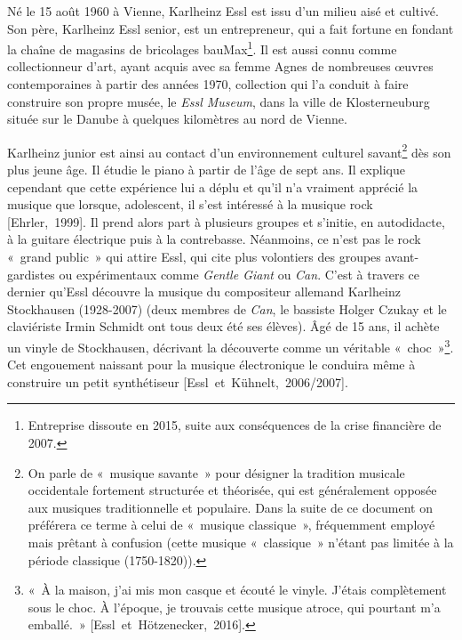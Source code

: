 \documentclass[a4paper,12pt]{article}
\newcommand{\guill}[1]{«~#1~»}
\newcommand{\cicite}[1]{{\footnotesize[#1]}}
\begin{document}
Né le 15 août 1960 à Vienne, Karlheinz Essl est issu d'un milieu aisé et cultivé. Son père, Karlheinz Essl senior, est un entrepreneur, qui a fait fortune en fondant la chaîne de magasins de bricolages bauMax\footnote{Entreprise dissoute en 2015, suite aux conséquences de la crise financière de 2007.}. Il est aussi connu comme collectionneur d'art, ayant acquis avec sa femme Agnes de nombreuses œuvres contemporaines à partir des années 1970, collection qui l'a conduit à faire construire son propre musée, le \emph{Essl Museum}, dans la ville de Klosterneuburg située sur le Danube à quelques kilomètres au nord de Vienne.

Karlheinz junior est ainsi au contact d'un environnement culturel savant\footnote{On parle de \guill{musique savante} pour désigner la tradition musicale occidentale fortement structurée et théorisée, qui est généralement opposée aux musiques traditionnelle et populaire. Dans la suite de ce document on préférera ce terme à celui de \guill{musique classique}, fréquemment employé mais prêtant à confusion (cette musique \guill{classique} n'étant pas limitée à la période classique (1750-1820)).} dès son plus jeune âge. Il étudie le piano à partir de l'âge de sept ans. Il explique cependant que cette expérience lui a déplu et qu'il n'a vraiment apprécié la musique que lorsque, adolescent, il s'est intéressé à la musique rock \cicite{Ehrler,~1999}. Il prend alors part à plusieurs groupes et s'initie, en autodidacte, à la guitare électrique puis à la contrebasse. Néanmoins, ce n'est pas le rock \guill{grand public} qui attire Essl, qui cite plus volontiers des groupes avant-gardistes ou expérimentaux comme \emph{Gentle Giant} ou \emph{Can}. C'est à travers ce dernier qu'Essl découvre la musique du compositeur allemand Karlheinz Stockhausen (1928-2007) (deux membres de \emph{Can}, le bassiste Holger Czukay et le claviériste Irmin Schmidt ont tous deux été ses élèves). Âgé de 15 ans, il achète un vinyle de Stockhausen, décrivant la découverte comme un véritable \guill{choc}\footnote{\guill{À la maison, j'ai mis mon casque et écouté le vinyle. J'étais complètement sous le choc. À l'époque, je trouvais cette musique atroce, qui pourtant m'a emballé.} \cicite{Essl~et~Hötzenecker,~2016}.}. Cet engouement naissant pour la musique électronique le conduira même à construire un petit synthétiseur \cicite{Essl~et~Kühnelt,~2006/2007}.
\end{document}
